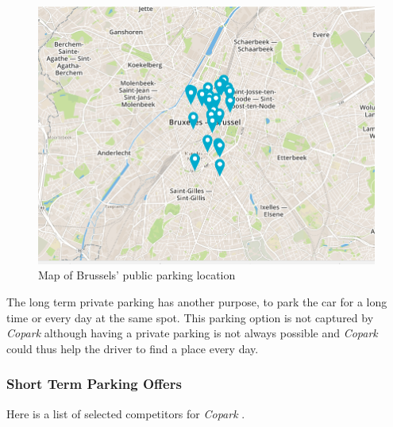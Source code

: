 \documentclass[12pt,a4paper,oneside]{book}
\newcommand{\bp}{\textit{Copark }}
\begin{document}
\begin{figure}[h]
\centering
\caption{Map of Brussels' public parking location\cite{pubparkmap}}
\label{pubparcmap}
\includegraphics[keepaspectratio=true,width=\textwidth-2cm]{images/publicpark.png}
\end{figure}

The long term private parking has another purpose, to park the car for a long time or every day at the same spot. This parking option is not captured by \bp although having a private parking is not always possible and \bp could thus help the driver to find a place every day.

\subsubsection{Short Term Parking Offers}

Here is a list of selected competitors for \bp .
\end{document}
